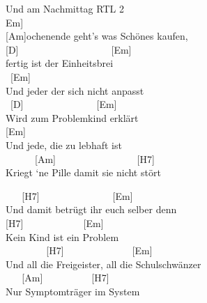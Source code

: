 \documentclass[
  letterpaper,
]{scrbook}
\begin{document}
Und am Nachmittag RTL 2\\
\hspace*{0.333em}{[}Em{]}\\
{[}Am{]}ochenende geht's was Schönes kaufen,\\
{[}D{]} ~ ~ ~ ~ ~ ~ ~ ~ ~ ~ ~ {[}Em{]}\\
fertig ist der Einheitsbrei\\
\hspace*{0.333em} ~{[}Em{]}\\
Und jeder der sich nicht anpasst\\
\hspace*{0.333em} ~{[}D{]} ~ ~ ~ ~ ~ ~ ~ ~ ~{[}Em{]}\\
Wird zum Problemkind erklärt\\
\hspace*{0.333em} {[}Em{]}\\
Und jede, die zu lebhaft ist\\
\hspace*{0.333em} ~ ~ ~ ~{[}Am{]} ~ ~ ~ ~ ~ ~ ~ ~ ~ ~{[}H7{]}\\
Kriegt `ne Pille damit sie nicht stört

~ ~ {[}H7{]} ~ ~ ~ ~ ~ ~ ~ ~ ~{[}Em{]}\\
Und damit betrügt ihr euch selber denn\\
{[}H7{]} ~ ~ ~ ~ ~ ~ ~ {[}Em{]}\\
Kein Kind ist ein Problem\\
\hspace*{0.333em} ~ ~ ~ ~ ~ {[}H7{]} ~ ~ ~ ~ ~ ~ ~ ~ {[}Em{]}\\
Und all die Freigeister, all die Schulschwänzer\\
\hspace*{0.333em} ~ ~ {[}Am{]} ~ ~ ~ ~ ~ ~{[}H7{]}\\
Nur Symptomträger im System
\end{document}
